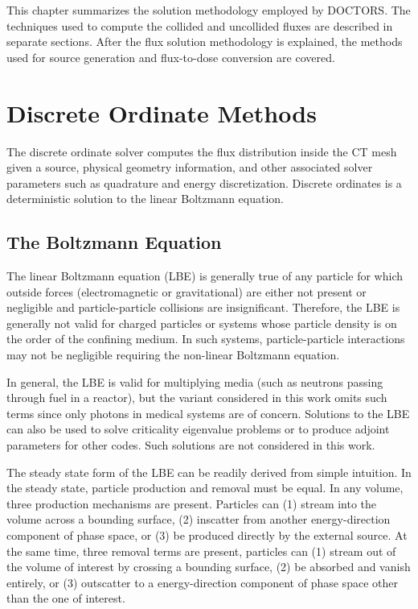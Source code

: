 
This chapter summarizes the solution methodology employed by DOCTORS. The techniques used to compute the collided and uncollided fluxes are described in separate sections. After the flux solution methodology is explained, the methods used for source generation and flux-to-dose conversion are covered.

\section{Discrete Ordinate Methods}

The discrete ordinate solver computes the flux distribution inside the CT mesh given a source, physical geometry information, and other associated solver parameters such as quadrature and energy discretization. Discrete ordinates is a deterministic solution to the linear Boltzmann equation.

\subsection{The Boltzmann Equation}

The linear Boltzmann equation (LBE) is generally true of any particle for which outside forces (electromagnetic or gravitational) are either not present or negligible and particle-particle collisions are insignificant. Therefore, the LBE is generally not valid for charged particles or systems whose particle density is on the order of the confining medium. In such systems, particle-particle interactions may not be negligible requiring the non-linear Boltzmann equation.

In general, the LBE is valid for multiplying media (such as neutrons passing through fuel in a reactor), but the variant considered in this work omits such terms since only photons in medical systems are of concern. Solutions to the LBE can also be used to solve criticality eigenvalue problems or to produce adjoint parameters for other codes. Such solutions are not considered in this work.

The steady state form of the LBE can be readily derived from simple intuition. In the steady state, particle production and removal must be equal. In any volume, three production mechanisms are present. Particles can (1) stream into the volume across a bounding surface, (2) inscatter from another energy-direction component of phase space, or (3) be produced directly by the external source. At the same time, three removal terms are present, particles can (1) stream out of the volume of interest by crossing a bounding surface, (2) be absorbed and vanish entirely, or (3) outscatter to a energy-direction component of phase space other than the one of interest.

